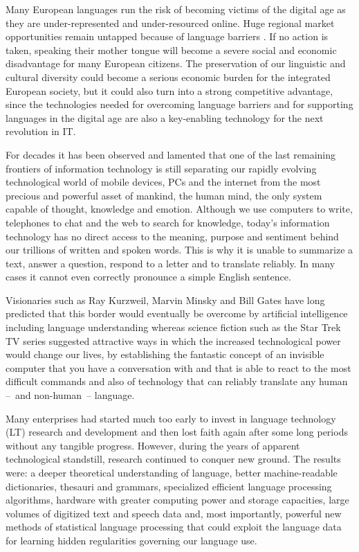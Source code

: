 \documentclass[10pt, plain]{../../metanetpaper}
\begin{document}

\begin{multicols}{2}

  Many European languages run the risk of becoming victims of the digital age as they are under-represented and under-resourced online. Huge regional market opportunities remain untapped because of language barriers \cite{EC3}. If no action is taken, speaking their mother tongue will become a severe social and economic disadvantage for many European citizens. The preservation of our linguistic and cultural diversity could become a serious economic burden for the integrated European society, but it could also turn into a strong competitive advantage, since the technologies needed for overcoming language barriers and for supporting languages in the digital age are also a key-enabling technology for the next revolution in IT.

  For decades it has been observed and lamented that one of the last remaining frontiers of information technology is still separating our rapidly evolving technological world of mobile devices, PCs and the internet from the most precious and powerful asset of mankind, the human mind, the only system capable of thought, knowledge and emotion. Although we use computers to write, telephones to chat and the web to search for knowledge, today's information technology has no direct access to the meaning, purpose and sentiment behind our trillions of written and spoken words. This is why it is unable to summarize a text, answer a question, respond to a letter and to translate reliably. In many cases it cannot even correctly pronounce a simple English sentence.

Visionaries such as Ray Kurzweil, Marvin Minsky and Bill Gates have long predicted that this border would eventually be overcome by artificial intelligence including language understanding whereas science fiction such as the Star Trek TV series suggested attractive ways in which the increased technological power would change our lives, by establishing the fantastic concept of an invisible computer that you have a conversation with and that is able to react to the most difficult commands and also of technology that can reliably translate any human --~and non-human~-- language.

Many enterprises had started much too early to invest in language technology (LT) research and development and then lost faith again after some long periods without any tangible progress. However, during the years of apparent technological standstill, research continued to conquer new ground. The results were: a deeper theoretical understanding of language, better machine-readable dictionaries, thesauri and grammars, specialized efficient language processing algorithms, hardware with greater computing power and storage capacities, large volumes of digitized text and speech data and, most importantly, powerful new methods of statistical language processing that could exploit the language data for learning hidden regularities governing our language use.


\end{multicols}
\end{document}
